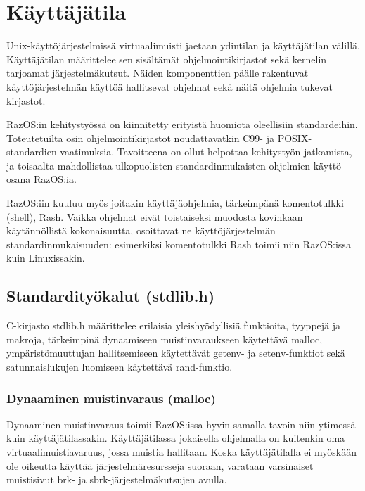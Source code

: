 \chapter{Käyttäjätila}
\label{Käyttäjätila}

Unix-käyttöjärjestelmissä virtuaalimuisti jaetaan ydintilan ja käyttäjätilan välillä. Käyttäjätilan määrittelee sen sisältämät ohjelmointikirjastot sekä kernelin tarjoamat järjestelmäkutsut. Näiden komponenttien päälle rakentuvat käyttöjärjestelmän käyttöä hallitsevat ohjelmat sekä näitä ohjelmia tukevat kirjastot.

\par

RazOS:in kehitystyössä on kiinnitetty erityistä huomiota oleellisiin standardeihin. Toteutetuilta osin ohjelmointikirjastot noudattavatkin C99- ja POSIX- standardien vaatimuksia. Tavoitteena on ollut helpottaa kehitystyön jatkamista, ja toisaalta mahdollistaa ulkopuolisten standardinmukaisten ohjelmien käyttö osana RazOS:ia.

\par

RazOS:iin kuuluu myös joitakin käyttäjäohjelmia, tärkeimpänä komentotulkki (shell), Rash. Vaikka ohjelmat eivät toistaiseksi muodosta kovinkaan käytännöllistä kokonaisuutta, osoittavat ne käyttöjärjestelmän standardinmukaisuuden: esimerkiksi komentotulkki Rash toimii niin RazOS:issa kuin Linuxissakin.

\section{Standardityökalut (stdlib.h)}

C-kirjasto stdlib.h määrittelee erilaisia yleishyödyllisiä funktioita, tyyppejä ja makroja, tärkeimpinä dynaamiseen muistinvaraukseen käytettävä malloc, ympäristömuuttujan hallitsemiseen käytettävät getenv- ja setenv-funktiot sekä satunnaislukujen luomiseen käytettävä rand-funktio.

\subsection{Dynaaminen muistinvaraus (malloc)}

Dynaaminen muistinvaraus toimii RazOS:issa hyvin samalla tavoin niin ytimessä kuin käyttäjätilassakin. Käyttäjätilassa jokaisella ohjelmalla on kuitenkin oma virtuaalimuistiavaruus, jossa muistia hallitaan. Koska käyttäjätilalla ei myöskään ole oikeutta käyttää järjestelmäresursseja suoraan, varataan varsinaiset muistisivut brk- ja sbrk-järjestelmäkutsujen avulla.

